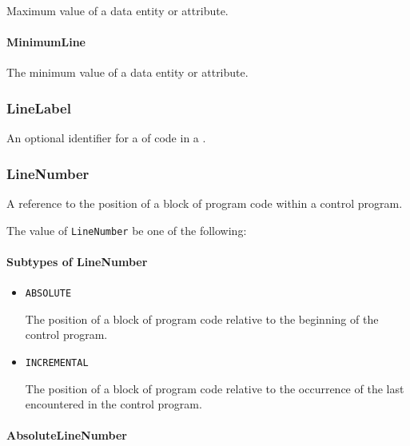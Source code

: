 Maximum value of a data entity or attribute.


\paragraph{MinimumLine}\mbox{}
\label{sec:MinimumLine}


The minimum value of a data entity or attribute.


\subsubsection{LineLabel}
\label{sec:LineLabel}



An optional identifier for a  of code in a .


\subsubsection{LineNumber}
\label{sec:LineNumber}



A reference to the position of a block of program code within a control program.


The value of \texttt{LineNumber} \MUST be one of the following: 

\FloatBarrier

\paragraph{Subtypes of LineNumber}\mbox{}
\label{sec:Subtypes of LineNumber}

\begin{itemize}

\item \texttt{ABSOLUTE}


The position of a block of program code relative to the beginning of the control program.

\item \texttt{INCREMENTAL}


The position of a block of program code relative to the occurrence of the last  encountered in the control program.


\end{itemize}

\paragraph{AbsoluteLineNumber}\mbox{}
\label{sec:AbsoluteLineNumber}


